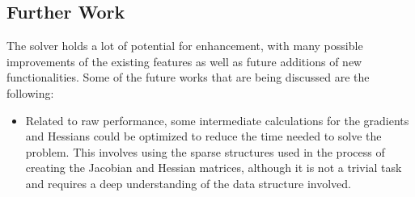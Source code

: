 
\subsection{Further Work}

The solver holds a lot of potential for enhancement, with many possible improvements of the existing features as well as future additions of new functionalities. Some of the 
future works that are being discussed are the following:

\begin{itemize}
    \item Related to raw performance, some intermediate calculations for the gradients and Hessians could be optimized to reduce the time needed to solve the problem. This involves using the sparse structures 
    used in the process of creating the Jacobian and Hessian matrices, although it is not a trivial task and requires a deep understanding of the data structure involved.


\end{itemize}